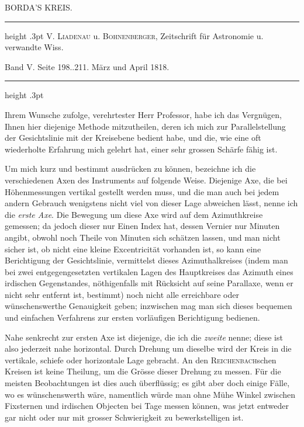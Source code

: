 \par\bigskip{}
\hypertarget{native-409-part-lower}{}\label{native-409-part-lower}
\begin{center}\large BORDA’S KREIS.\end{center}
\begin{center}\parbox{.98\linewidth}{\centering\small\frenchspacing
\hrule height .3pt\relax\vspace{2.5pt}
V. \textsc{Liadenau} u. \textsc{Bohnenberger}, Zeitschrift für Astronomie u. verwandte Wiss.\par
Band V. Seite 198..211. März und April 1818.\par
\vspace{2.5pt}\hrule height .3pt\relax
}\end{center}
\par\indent Ihrem Wunsche zufolge, verehrtester Herr Professor, habe ich das Vergnügen, Ihnen hier diejenige Methode mitzutheilen, deren ich mich zur Parallelstellung der Gesichtslinie mit der Kreisebene bedient habe, und die, wie eine oft wiederholte Erfahrung mich gelehrt hat, einer sehr grossen Schärfe fähig ist.

\par\indent Um mich kurz und bestimmt ausdrücken zu können, bezeichne ich die verschiedenen Axen des Instruments auf folgende Weise. Diejenige Axe, die bei Höhenmessungen vertikal gestellt werden muss, und die man auch bei jedem andern Gebrauch wenigstens nicht viel von dieser Lage abweichen lässt, nenne ich die \emph{erste Axe}. Die Bewegung um diese Axe wird auf dem Azimuthkreise gemessen; da jedoch dieser nur Einen Index hat, dessen Vernier nur Minuten angibt, obwohl noch Theile von Minuten sich schätzen lassen, und man nicht sicher ist, ob nicht eine kleine Excentricität vorhanden ist, so kann eine Berichtigung der Gesichtslinie, vermittelst dieses Azimuthalkreises (indem man bei zwei entgegengesetzten vertikalen Lagen des Hauptkreises das Azimuth eines irdischen Gegenstandes, nöthigenfalls mit Rücksicht auf seine Parallaxe, wenn er nicht sehr entfernt ist, bestimmt) noch nicht alle erreichbare oder wünschenswerthe Genauigkeit geben; inzwischen mag man sich dieses bequemen und einfachen Verfahrens zur ersten vorläufigen Berichtigung bedienen.

\par\indent Nahe senkrecht zur ersten Axe ist diejenige, die ich die \emph{zweite} nenne; diese ist also jederzeit nahe horizontal. Durch Drehung um dieselbe wird der Kreis in die vertikale, schiefe oder horizontale Lage gebracht. An den \textsc{Reichenbach}schen Kreisen ist keine Theilung, um die Grösse dieser Drehung zu messen. Für die meisten Beobachtungen ist dies auch überflüssig; es gibt aber doch einige Fälle, wo es wünschenswerth wäre, namentlich würde man ohne Mühe Winkel zwischen Fixsternen und irdischen Objecten bei Tage messen können, was jetzt entweder gar nicht oder nur mit grosser Schwierigkeit zu bewerkstelligen ist.

